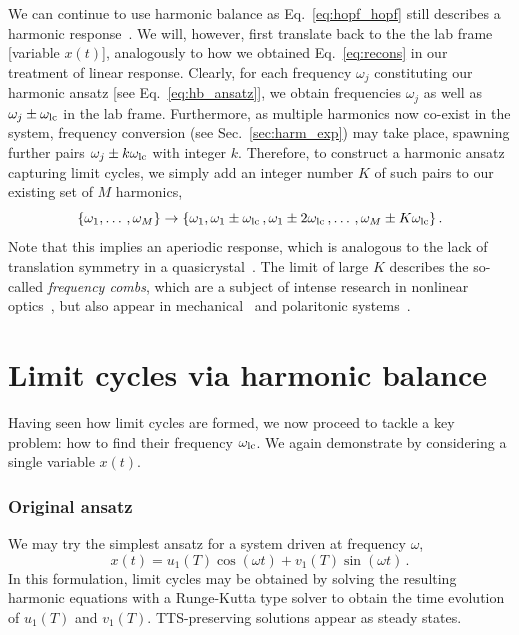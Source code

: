 We can continue to use harmonic balance as Eq.~\eqref{eq:hopf_hopf} still describes a harmonic response~\cite{Allwright_1977}. We will, however, first translate back to the the lab frame [variable $x(t)$], analogously to how we obtained Eq.~\eqref{eq:recons} in our treatment of linear response. Clearly, for each frequency $\omega_j$ constituting our harmonic ansatz [see Eq.~\eqref{eq:hb_ansatz}], we obtain frequencies $\omega_j$ as well as $\omega_j \pm \omega_{\rm lc}$ in the lab frame. 
Furthermore, as multiple harmonics now co-exist in the system, frequency conversion (see Sec.~\ref{sec:harm_exp}) may take place, spawning further pairs $\omega_j \pm k \omega_{\rm lc} $ with integer $k$. Therefore, to construct a harmonic ansatz capturing limit cycles, we simply add an integer number $K$ of such pairs to our existing set of $M$ harmonics,
\begin{equation}
\{ \omega_1, \ldots\,, \omega_M \} \rightarrow \{\omega_1, \omega_1 \pm \omega_{\rm lc} \,, \omega_1 \pm 2 \omega_{\rm lc}\,, \ldots\,, \omega_M \pm K \omega_{\rm lc} \} \,.
\end{equation}
Note that this implies an aperiodic response, which is analogous to the lack of translation symmetry in a quasicrystal~\cite{Pizzi_2019, Giergiel_2019}. The limit of large $K$ describes the so-called \textit{frequency combs}, which are a subject of intense research in nonlinear optics~\cite{Weng_2022, Lugiato_2018, Herr_2012}, but also appear in mechanical~\cite{Ochs_2022, Dykman2019, Czaplewski_2019, Ganesan_2018, Ganesan2017} and polaritonic systems~\cite{Zambon_2020}.

\section{Limit cycles via harmonic balance} \label{sec:hopf_hb}

Having seen how limit cycles are formed, we now proceed to tackle a key problem: how to find their frequency $\omega_{\rm lc}$. We again demonstrate by considering a single variable $x(t)$.

\subsubsection{Original ansatz}

We may try the simplest ansatz for a system driven at frequency $\omega$,
\begin{equation} \label{eq:hopf_simple_ansatz}
 x(t) = u_1(T) \cos(\omega t ) + v_1(T) \sin(\omega t) \,.
\end{equation} 
In this formulation, limit cycles may be obtained by solving the resulting harmonic equations with a Runge-Kutta type solver to obtain the time evolution of $u_1(T)$ and $v_1(T)$. TTS-preserving solutions appear as steady states.

